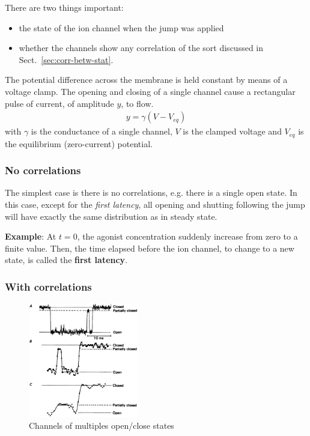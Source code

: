 There are two things important:
\begin{itemize}
\item the state of the ion channel when the jump was applied
\item whether the channels show any correlation of the sort discussed
  in Sect.~\ref{sec:corr-betw-stat}.
\end{itemize}

\begin{framed}
  The potential difference across the membrane is held constant by means
  of a voltage clamp. The opening and closing of a single channel cause
  a rectangular pulse of current, of amplitude $y$, to flow.
  \begin{eqnarray}
    \label{eq:566}
    y = \gamma (V-V_{eq})
  \end{eqnarray}
  with $\gamma$ is the conductance of a single channel, $V$ is the
  clamped voltage and $V_{eq}$ is the equilibrium (zero-current)
  potential.
\end{framed}

\subsubsection{No correlations}
\label{sec:no-correlations}

\begin{framed}
  The simplest case is there is no correlations, e.g. there is a
  single open state. In this case, except for the {\it first latency},
  all opening and shutting following the jump will have exactly the
  same distribution as in steady state.
\end{framed}

{\bf Example}: At $t=0$, the agonist concentration suddenly increase
from zero to a finite value. Then, the time elapsed before the ion
channel, to change to a new state, is called the {\bf first latency}.


\subsubsection{With correlations}
\label{sec:with-correlations}

\begin{figure}[hbt]
  \centerline{\includegraphics[height=5cm, angle=0]{./images/multiplestate_channel.eps}}
  \caption{Channels of multiples open/close states~\citep{colquhoun1985fes}}
  \label{fig:channel-state}
\end{figure}

